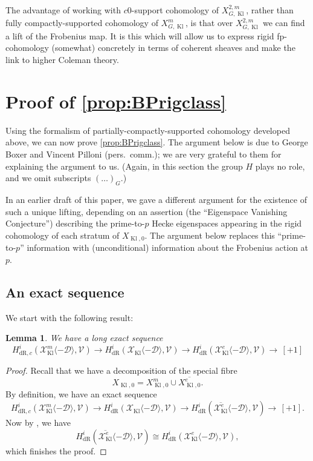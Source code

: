 \documentclass[cjm]{ipart}
\theoremstyle{plain}
\newtheorem{lemma}[theorem]{Lemma}
\theoremstyle{remark}
\DeclareMathOperator{\Kl}{Kl}
\newcommand{\cD}{\mathcal{D}}
\newcommand{\cV}{\mathcal{V}}
\newcommand{\cX}{\mathcal{X}}
\newcommand{\dR}{\mathrm{dR}}
\numberwithin{equation}{subsection}
\begin{document}
  \begin{remark}
   The advantage of working with $c0$-support cohomology of $X_{G, \Kl}^{2, m}$, rather than fully compactly-supported cohomology of $X_{G, \Kl}^{m}$, is that over $X_{G, \Kl}^{2, m}$ we can find a lift of the Frobenius map. It is this which will allow us to express rigid fp-cohomology (somewhat) concretely in terms of coherent sheaves and make the link to higher Coleman theory.
  \end{remark}

 \section{Proof of \texorpdfstring{\cref*{prop:BPrigclass}}{Theorem 11.1.1}}
  \label{sect:BPproof}

  Using the formalism of partially-compactly-supported cohomology developed above, we can now prove \cref{prop:BPrigclass}. The argument below is due to George Boxer and Vincent Pilloni (pers.~comm.); we are very grateful to them for explaining the argument to us. (Again, in this section the group $H$ plays no role, and we omit subscripts $(\dots)_G$.)

  \begin{remark}
   In an earlier draft of this paper, we gave a different argument for the existence of such a unique lifting, depending on an assertion (the ``Eigenspace Vanishing Conjecture'') describing the prime-to-$p$ Hecke eigenspaces appearing in the rigid cohomology of each stratum of $X_{\Kl, 0}$. The argument below replaces this ``prime-to-$p$'' information with (unconditional) information about the Frobenius action at $p$.
  \end{remark}

 \subsection{An exact sequence} We start with the following result:

  \begin{lemma}\label{lem:GKes}
   We have a long exact sequence
   \[ H^i_{\dR,c} (\cX^m_{\Kl}\langle -\cD\rangle,\cV)\to H^i_{\dR}(\cX_{\Kl}\langle -\cD\rangle,\cV)\to H^i_{\dR}(\cX_{\Kl}^e\langle -\cD\rangle,\cV) \to\, [+1]\]
  \end{lemma}
  \begin{proof}
   Recall that we have a decomposition of the special fibre
   \[ X_{\Kl,0}=X^m_{\Kl,0}\cup \overline{X^e_{\Kl,0}}.    \]
   By definition, we have an exact sequence
   \[ H^i_{\dR,c} (\cX^m_{\Kl}\langle -\cD\rangle,\cV)\to H^i_{\dR}(\cX_{\Kl}\langle -\cD\rangle,\cV)\to H^i_{\dR}(\overline{\cX_{\Kl}^e}\langle -\cD\rangle,\cV) \to\, [+1]. \]
   Now by \cite[Theorem C]{grossekloenne02}, we have
   \[ H^i_{\dR}(\overline{\cX_{\Kl}^e}\langle -\cD\rangle,\cV)\cong H^i_{\dR}(\cX_{\Kl}^e\langle -\cD\rangle,\cV),\]
   which finishes the proof.
  \end{proof}
\end{document}
